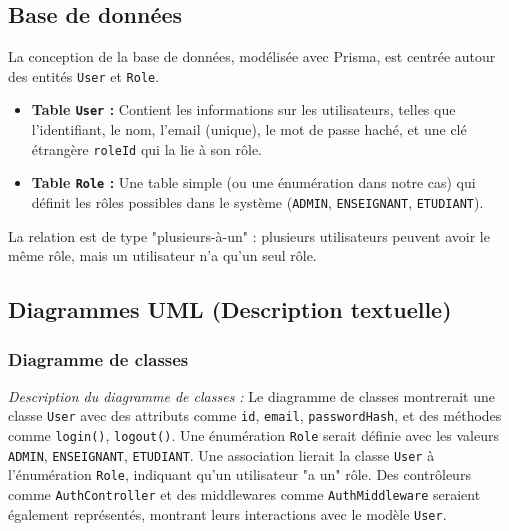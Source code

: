 \documentclass{report}
\begin{document}
\subsection{\color{SoftEspresso}Base de données}
La conception de la base de données, modélisée avec Prisma, est centrée autour des entités \texttt{User} et \texttt{Role}.
\begin{itemize}
    \item \textbf{\color{SoftEspresso}Table \texttt{User} :} Contient les informations sur les utilisateurs, telles que l'identifiant, le nom, l'email (unique), le mot de passe haché, et une clé étrangère \texttt{roleId} qui la lie à son rôle.
    \item \textbf{\color{SoftEspresso}Table \texttt{Role} :} Une table simple (ou une énumération dans notre cas) qui définit les rôles possibles dans le système (\texttt{ADMIN}, \texttt{ENSEIGNANT}, \texttt{ETUDIANT}).
\end{itemize}
La relation est de type "plusieurs-à-un" : plusieurs utilisateurs peuvent avoir le même rôle, mais un utilisateur n'a qu'un seul rôle.

\subsection{\color{SoftEspresso}Diagrammes UML (Description textuelle)}
\subsubsection{\color{SoftEspresso}Diagramme de classes}
\textit{Description du diagramme de classes :} Le diagramme de classes montrerait une classe \texttt{User} avec des attributs comme \texttt{id}, \texttt{email}, \texttt{passwordHash}, et des méthodes comme \texttt{login()}, \texttt{logout()}. Une énumération \texttt{Role} serait définie avec les valeurs \texttt{ADMIN}, \texttt{ENSEIGNANT}, \texttt{ETUDIANT}. Une association lierait la classe \texttt{User} à l'énumération \texttt{Role}, indiquant qu'un utilisateur "a un" rôle. Des contrôleurs comme \texttt{AuthController} et des middlewares comme \texttt{AuthMiddleware} seraient également représentés, montrant leurs interactions avec le modèle \texttt{User}.
\end{document}
